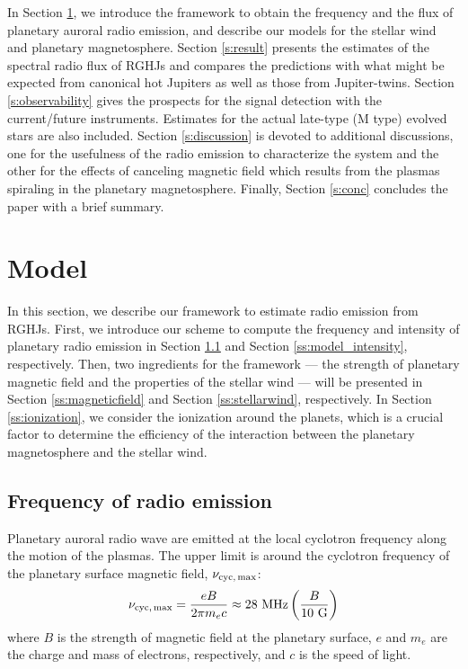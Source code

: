 \documentclass[iop,numberedappendix,apj]{emulateapj}
\begin{document}
In Section \ref{s:assumptions}, we introduce the framework to obtain the frequency and the flux of planetary auroral radio emission, and describe our models for the stellar wind and planetary magnetosphere.
Section \ref{s:result} presents the estimates of the spectral radio flux of RGHJs and compares the predictions with what might be expected from canonical hot Jupiters as well as those from Jupiter-twins.
Section \ref{s:observability} gives the prospects for the signal detection with the current/future instruments. 
Estimates for the actual late-type (M type) evolved stars are also included. 
Section \ref{s:discussion} is devoted to additional discussions, one for the usefulness of the radio emission to characterize the system and the other for the effects of canceling magnetic field which results from the plasmas spiraling in the planetary magnetosphere.  
Finally, Section \ref{s:conc} concludes the paper with a brief summary. 


\section{Model}
\label{s:assumptions}


In this section, we describe our framework to estimate radio emission from RGHJs. 
First, we introduce our scheme to compute the frequency and intensity of planetary radio emission in Section \ref{ss:model_frequency} and Section \ref{ss:model_intensity}, respectively. 
Then, two ingredients for the framework --- the strength of planetary magnetic field and the properties of the stellar wind --- will be presented in Section \ref{ss:magneticfield} and Section \ref{ss:stellarwind}, respectively. 
In Section \ref{ss:ionization}, we consider the ionization around the planets, which is a crucial factor to determine the efficiency of the interaction between the planetary magnetosphere and the stellar wind. 


\subsection{Frequency of radio emission}
\label{ss:model_frequency}

Planetary auroral radio wave are emitted at the local cyclotron frequency along the motion of the plasmas.
The upper limit is around the cyclotron frequency of the planetary surface magnetic field, $\nu_{\rm cyc,\,max}$: 
\begin{equation}
\nu_{\rm cyc,\,max} = \frac{eB}{2\pi m_e c} \approx 28 {\rm~MHz} \left( \frac{B}{10 \rm~G} \right) \label{eq:fcyc}
\end{equation}
where $B$ is the strength of magnetic field at the planetary surface, $e$ and $m_e$ are the charge and mass of electrons, respectively, and $c$ is the speed of light. 
\end{document}
